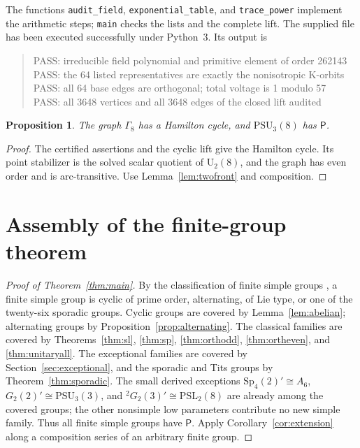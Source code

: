 \documentclass[11pt]{article}
\newtheorem{proposition}[theorem]{Proposition}
\theoremstyle{definition}
\newcommand{\Pp}{\mathsf P}
\newcommand{\PSL}{\mathrm{PSL}}
\newcommand{\Sp}{\mathrm{Sp}}
\newcommand{\PSU}{\mathrm{PSU}}
\newcommand{\U}{\mathrm U}
\begin{document}
The functions \texttt{audit\_field}, \texttt{exponential\_table}, and \texttt{trace\_power} implement the arithmetic steps; \texttt{main} checks the lists and the complete lift. The supplied file has been executed successfully under Python~3. Its output is
\begin{quote}\small\ttfamily
PASS: irreducible field polynomial and primitive element of order 262143\\
PASS: the 64 listed representatives are exactly the nonisotropic K-orbits\\
PASS: all 64 base edges are orthogonal; total voltage is 1 modulo 57\\
PASS: all 3648 vertices and all 3648 edges of the closed lift audited
\end{quote}
\begin{proposition}\label{prop:q8}
The graph $\Gamma_8$ has a Hamilton cycle, and $\PSU_3(8)$ has $\Pp$.
\end{proposition}
\begin{proof}
The certified assertions and the cyclic lift give the Hamilton cycle. Its point stabilizer is the solved scalar quotient of $\U_2(8)$, and the graph has even order and is arc-transitive. Use Lemma~\ref{lem:twofront} and composition.
\end{proof}

\section{Assembly of the finite-group theorem}\label{sec:assembly}
\begin{proof}[Proof of Theorem~\ref{thm:main}]
By the classification of finite simple groups \cite{GLS}, a finite simple group is cyclic of prime order, alternating, of Lie type, or one of the twenty-six sporadic groups. Cyclic groups are covered by Lemma~\ref{lem:abelian}; alternating groups by Proposition~\ref{prop:alternating}. The classical families are covered by Theorems~\ref{thm:sl}, \ref{thm:sp}, \ref{thm:orthodd}, \ref{thm:ortheven}, and \ref{thm:unitaryall}. The exceptional families are covered by Section~\ref{sec:exceptional}, and the sporadic and Tits groups by Theorem~\ref{thm:sporadic}. The small derived exceptions $\Sp_4(2)'\cong A_6$, $G_2(2)'\cong\PSU_3(3)$, and $^2G_2(3)'\cong\PSL_2(8)$ are already among the covered groups; the other nonsimple low parameters contribute no new simple family. Thus all finite simple groups have $\Pp$. Apply Corollary~\ref{cor:extension} along a composition series of an arbitrary finite group.
\end{proof}
\end{document}
